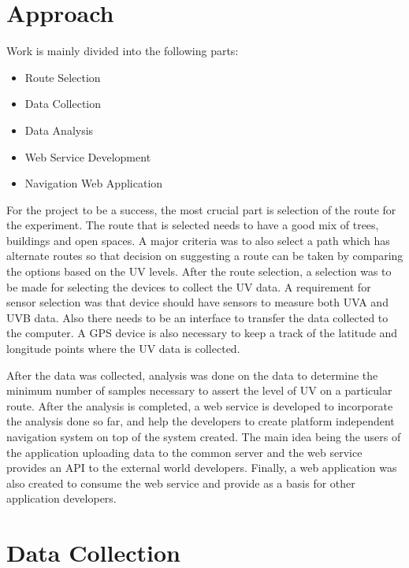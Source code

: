 \documentclass[conference]{IEEETran}
\begin{document}
\section{Approach}
Work is mainly divided into the following parts:
\begin{itemize}
\item{Route Selection}
\item{Data Collection}
\item{Data Analysis}
\item{Web Service Development}
\item{Navigation Web Application}
\end{itemize}
For the project to be a success, the most crucial part is selection of the route for the experiment. The route that is selected needs to have a good mix of trees, buildings and open spaces. A major criteria was to also select a path which has alternate routes so that decision on suggesting a route can be taken by comparing the options based on the UV levels. After the route selection, a selection was to be made for selecting the devices to collect the UV data. A requirement for sensor selection was that device should have sensors to measure both UVA and UVB data. Also there needs to be an interface to transfer the data collected to the computer.  A GPS device is also necessary to keep a track of the latitude and longitude points where the UV data is collected.  

After the data was collected, analysis was done on the data to determine the minimum number of samples necessary to assert the level of UV on a particular route. After the analysis is completed, a web service is developed to incorporate the analysis done so far, and help the developers to create platform independent navigation system on top of the system created. The main idea being the users of the application uploading data to the common server and the web service provides an API to the external world developers. Finally, a web application was also created to consume the web service and provide as a basis for other application developers. 

\section{Data Collection}
\end{document}
